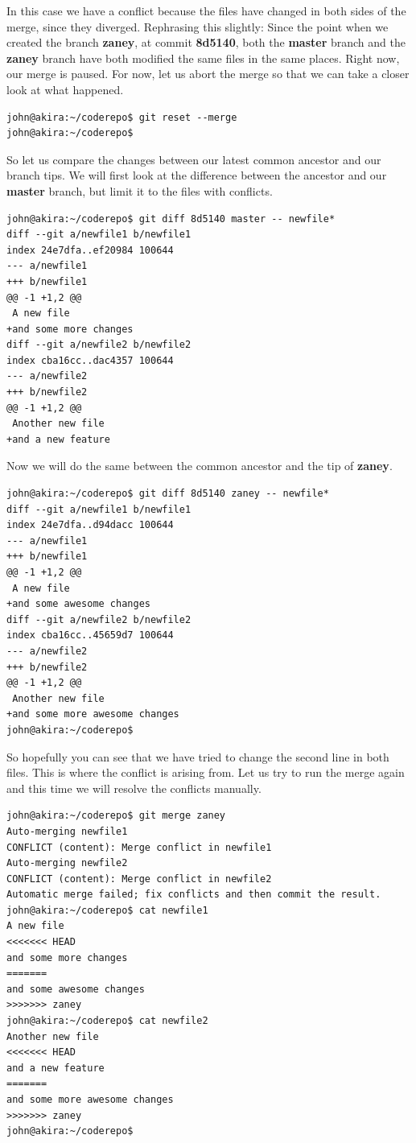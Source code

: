 In this case we have a conflict because the files have changed in both sides of the merge, since they diverged.  Rephrasing this slightly: Since the point when we created the branch \textbf{zaney}, at commit \textbf{8d5140}, both the \textbf{master} branch and the \textbf{zaney} branch have both modified the same files in the same places.  Right now, our merge is paused.  For now, let us abort the merge so that we can take a closer look at what happened.

\begin{Verbatim}[frame=leftline,framerule=1mm,fontsize=\relsize{-3}] 
john@akira:~/coderepo$ git reset --merge
john@akira:~/coderepo$ 
\end{Verbatim}

So let us compare the changes between our latest common ancestor and our branch tips.  We will first look at the difference between the ancestor and our \textbf{master} branch, but limit it to the files with conflicts.

\begin{Verbatim}[frame=leftline,framerule=1mm,fontsize=\relsize{-3}] 
john@akira:~/coderepo$ git diff 8d5140 master -- newfile*
diff --git a/newfile1 b/newfile1
index 24e7dfa..ef20984 100644
--- a/newfile1
+++ b/newfile1
@@ -1 +1,2 @@
 A new file
+and some more changes
diff --git a/newfile2 b/newfile2
index cba16cc..dac4357 100644
--- a/newfile2
+++ b/newfile2
@@ -1 +1,2 @@
 Another new file
+and a new feature
\end{Verbatim}

Now we will do the same between the common ancestor and the tip of \textbf{zaney}.

\begin{Verbatim}[frame=leftline,framerule=1mm,fontsize=\relsize{-3}] 
john@akira:~/coderepo$ git diff 8d5140 zaney -- newfile*
diff --git a/newfile1 b/newfile1
index 24e7dfa..d94dacc 100644
--- a/newfile1
+++ b/newfile1
@@ -1 +1,2 @@
 A new file
+and some awesome changes
diff --git a/newfile2 b/newfile2
index cba16cc..45659d7 100644
--- a/newfile2
+++ b/newfile2
@@ -1 +1,2 @@
 Another new file
+and some more awesome changes
john@akira:~/coderepo$ 
\end{Verbatim}

So hopefully you can see that we have tried to change the second line in both files.  This is where the conflict is arising from.  Let us try to run the merge again and this time we will resolve the conflicts manually.

\begin{Verbatim}[frame=leftline,framerule=1mm,fontsize=\relsize{-3}] 
john@akira:~/coderepo$ git merge zaney
Auto-merging newfile1
CONFLICT (content): Merge conflict in newfile1
Auto-merging newfile2
CONFLICT (content): Merge conflict in newfile2
Automatic merge failed; fix conflicts and then commit the result.
john@akira:~/coderepo$ cat newfile1
A new file
<<<<<<< HEAD
and some more changes
=======
and some awesome changes
>>>>>>> zaney
john@akira:~/coderepo$ cat newfile2
Another new file
<<<<<<< HEAD
and a new feature
=======
and some more awesome changes
>>>>>>> zaney
john@akira:~/coderepo$ 
\end{Verbatim}

